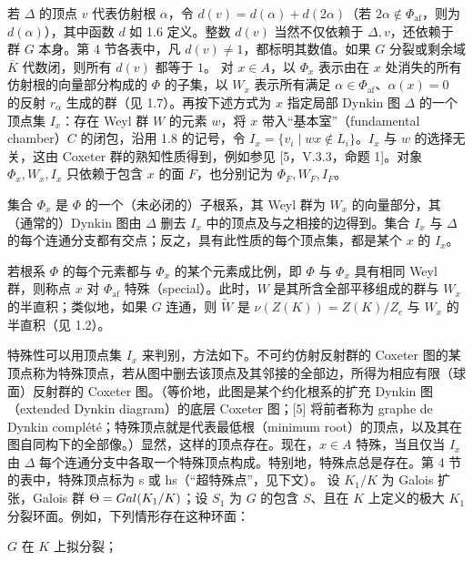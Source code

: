 若 $\Delta$ 的顶点 $v$ 代表仿射根 $\alpha$，令 $d(v)=d(\alpha)+d(2\alpha)$（若 $2\alpha\notin\Phi_{\mathrm{af}}$，则为 $d(\alpha)$），其中函数 $d$ 如 1.6 定义。整数 $d(v)$ 当然不仅依赖于 $\Delta,v$，还依赖于群 $G$ 本身。第 4 节各表中，凡 $d(v)\ne1$，都标明其数值。如果 $G$ 分裂或剩余域 $\overline K$ 代数闭，则所有 $d(v)$ 都等于 $1$。
对 $x\in A$，以 $\Phi_x$ 表示由在 $x$ 处消失的所有仿射根的向量部分构成的 $\Phi$ 的子集，以 $W_x$ 表示所有满足 $\alpha\in\Phi_{\mathrm{af}}$、$\alpha(x)=0$ 的反射 $r_\alpha$ 生成的群（见 1.7）。再按下述方式为 $x$ 指定局部 Dynkin 图 $\Delta$ 的一个顶点集 $I_x$：存在 Weyl 群 $W$ 的元素 $w$，将 $x$ 带入“基本室”（fundamental chamber）$C$ 的闭包，沿用 1.8 的记号，令 $I_x=\{v_i\mid wx\notin L_i\}$。$I_x$ 与 $w$ 的选择无关，这由 Coxeter 群的熟知性质得到，例如参见 [5，V.3.3，命题 1]。对象 $\Phi_x,W_x,I_x$ 只依赖于包含 $x$ 的面 $F$，也分别记为 $\Phi_F,W_F,I_F$。

集合 $\Phi_x$ 是 $\Phi$ 的一个（未必闭的）子根系，其 Weyl 群为 $W_x$ 的向量部分，其（通常的）Dynkin 图由 $\Delta$ 删去 $I_x$ 中的顶点及与之相接的边得到。集合 $I_x$ 与 $\Delta$ 的每个连通分支都有交点；反之，具有此性质的每个顶点集，都是某个 $x$ 的 $I_x$。

若根系 $\Phi$ 的每个元素都与 $\Phi_x$ 的某个元素成比例，即 $\Phi$ 与 $\Phi_x$ 具有相同 Weyl 群，则称点 $x$ 对 $\Phi_{\mathrm{af}}$ 特殊（special）。此时，$W$ 是其所含全部平移组成的群与 $W_x$ 的半直积；类似地，如果 $G$ 连通，则 $\widetilde W$ 是 $\nu(Z(K))=Z(K)/Z_c$ 与 $W_x$ 的半直积（见 1.2）。

特殊性可以用顶点集 $I_x$ 来判别，方法如下。不可约仿射反射群的 Coxeter 图的某顶点称为特殊顶点，若从图中删去该顶点及其邻接的全部边，所得为相应有限（球面）反射群的 Coxeter 图。（等价地，此图是某个约化根系的扩充 Dynkin 图（extended Dynkin diagram）的底层 Coxeter 图；[5] 将前者称为 graphe de Dynkin complété；特殊顶点就是代表最低根（minimum root）的顶点，以及其在图自同构下的全部像。）显然，这样的顶点存在。现在，$x\in A$ 特殊，当且仅当 $I_x$ 由 $\Delta$ 每个连通分支中各取一个特殊顶点构成。特别地，特殊点总是存在。第 4 节的表中，特殊顶点标为 s 或 hs（“超特殊点”，见下文）。
设 $K_1/K$ 为 Galois 扩张，Galois 群 $\Theta=Gal(K_1/K)$；设 $S_1$ 为 $G$ 的包含 $S$、且在 $K$ 上定义的极大 $K_1$ 分裂环面。例如，下列情形存在这种环面：

$G$ 在 $K$ 上拟分裂；

